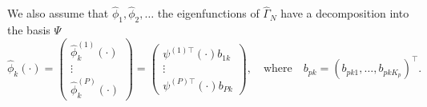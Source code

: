 We also assume that $\widehat{\phi}_1, \widehat{\phi}_2, \dots$ the eigenfunctions of $\widehat{\Gamma}_N$ have a decomposition into the basis $\Psi$
\begin{equation}
    \widehat{\phi}_k(\cdot) = 
        \begin{pmatrix} 
            \widehat{\phi}_k^{(1)}(\cdot) \\
            \vdots \\
            \widehat{\phi}_k^{(P)}(\cdot)
        \end{pmatrix} = 
        \begin{pmatrix} 
            \psi^{(1) \top}(\cdot) b_{1k} \\
            \vdots \\
            \psi^{(P) \top}(\cdot) b_{Pk}
        \end{pmatrix}, \quad\text{where}\quad
        b_{pk} = \left(b_{p k 1}, \dots, b_{p k K_p} \right)^\top.
\end{equation}

